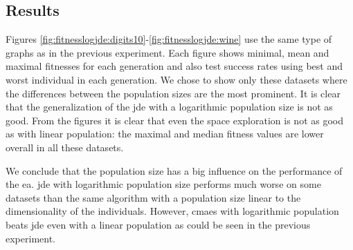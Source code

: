 \documentclass[12pt,a4paper]{report}
\begin{document}
\subsection{Results}

Figures \ref{fig:fitnesslogjde:digits10}-\ref{fig:fitnesslogjde:wine} use the same type of graphs as in the previous experiment. Each figure shows minimal, mean and maximal fitnesses for each generation and also test success rates using best and worst individual in each generation. We chose to show only these datasets where the differences between the population sizes are the most prominent. It is clear that the generalization of the \ac{jde} with a logarithmic population size is not as good. From the figures it is clear that even the space exploration is not as good as with linear population: the maximal and median fitness values are lower overall in all these datasets.

We conclude that the population size has a big influence on the performance of the \acl{ea}. \ac{jde} with logarithmic population size performs much worse on some datasets than the same algorithm with a population size linear to the dimensionality of the individuals. However, \ac{cmaes} with logarithmic population beats \ac{jde} even with a linear population as could be seen in the previous experiment.

\end{document}
